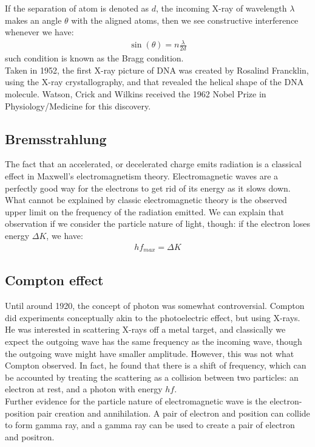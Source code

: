 \documentclass[11pt]{article}
\theoremstyle{break}
\theoremstyle{break}
\begin{document}
If the separation of atom is denoted as $d$, the incoming X-ray of wavelength $\lambda$ makes an angle $\theta$ with the aligned atoms, then we see constructive interference whenever we have:
\begin{align*}
\sin(\theta) = n \frac{\lambda}{2d}
\end{align*}
such condition is known as the Bragg condition. \\

Taken in 1952, the first X-ray picture of DNA was created by Rosalind Francklin, using the X-ray crystallography, and that revealed the helical shape of the DNA molecule. Watson, Crick and Wilkins received the 1962 Nobel Prize in Physiology/Medicine for this discovery.\\

\subsection{Bremsstrahlung}
The fact that an accelerated, or decelerated charge emits radiation is a classical effect in Maxwell's electromagnetism theory. Electromagnetic waves are a perfectly good way for the electrons to get rid of its energy as it slows down. What cannot be explained by classic electromagnetic theory is the observed upper limit on the frequency of the radiation emitted. We can explain that observation if we consider the particle nature of light, though: if the electron loses energy $\Delta K$, we have:
\begin{align*}
hf_{max} = \Delta K
\end{align*}

\subsection{Compton effect}
Until around 1920, the concept of photon was somewhat controversial. Compton did experiments conceptually akin to the photoelectric effect, but using X-rays. He was interested in scattering X-rays off a metal target, and classically we expect the outgoing wave has the same frequency as the incoming wave, though the outgoing wave might have smaller amplitude. However, this was not what Compton observed. In fact, he found that there is a shift of frequency, which can be accounted by treating the scattering as a collision between two particles: an electron at rest, and a photon with energy $hf$.\\


Further evidence for the particle nature of electromagnetic wave is the electron-position pair creation and annihilation. A pair of electron and position can collide to form gamma ray, and a gamma ray can be used to create a pair of electron and positron.\\
\end{document}
